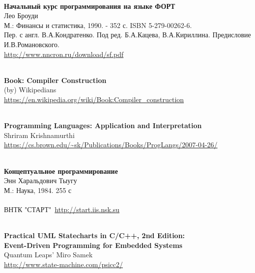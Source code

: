\begin{thebibliography}{99}
\clearpage
{}\ \\
\textbf{Начальный курс программирования на языке ФОРТ}\\
Лео Броуди \\
М.: Финансы и статистика, 1990. - 352 с.  ISBN 5-279-00262-6.\\
Пер. с англ. В.А.Кондратенко. Под ред. Б.А.Кацева, В.А.Кириллина. Предисловие
И.В.Романовского.\\
\url{http://www.nncron.ru/download/sf.pdf}

\clearpage
{}\ \\
\textbf{Book: Compiler Construction}\\
(by) Wikipedians\\
\url{https://en.wikipedia.org/wiki/Book:Compiler_construction}

\clearpage
{}\ \\
\textbf{Programming Languages: Application and Interpretation}\\
Shriram Krishnamurthi\\
\url{https://cs.brown.edu/~sk/Publications/Books/ProgLangs/2007-04-26/}

\clearpage
{}\ \\
\textbf{Концептуальное программирование}\\
Энн Харальдович Тыугу\\
М.: Наука, 1984. 255 с\\
\ \\
ВНТК "СТАРТ"\ \url{http://start.iis.nsk.su}

\clearpage
{}\ \\
\textbf{Practical UML Statecharts in C/C++, 2nd Edition:\\
Event-Driven Programming for Embedded Systems}\\
Quantum Leaps' Miro Samek\\
\url{http://www.state-machine.com/psicc2/}

\end{thebibliography}
